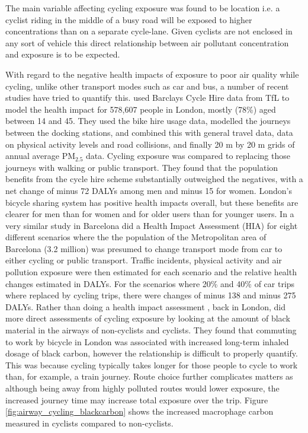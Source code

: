 The main variable affecting cycling exposure was found to be location i.e. a cyclist riding in the middle of a busy road will be exposed to higher concentrations than on a separate cycle-lane. Given cyclists are not enclosed in any sort of vehicle this direct relationship between air pollutant concentration and exposure is to be expected.

With regard to the negative health impacts of exposure to poor air quality while cycling, unlike other transport modes such as car and bus, a number of recent studies have tried to quantify this. \cite{Woodcock2014} used Barclays Cycle Hire data from TfL to model the health impact for 578,607 people in London, mostly (78\%) aged between 14 and 45. They used the bike hire usage data, modelled the journeys between the docking stations, and combined this with general travel data, data on physical activity levels and road collisions, and finally 20 m by 20 m grids of annual average PM$_{2.5}$ data. Cycling exposure was compared to replacing those journeys with walking or public transport. They found that the population benefits from the cycle hire scheme substantially outweighed the negatives, with a net change of minus 72 DALYs among men and minus 15 for women. London’s bicycle sharing system has positive health impacts overall, but these benefits are clearer for men than for women and for older users than for younger users. In a very similar study in Barcelona \cite{Rojas-Rueda2013} did a Health Impact Assessment (HIA) for eight different scenarios where the the population of the Metropolitan area of Barcelona (3.2 million) was presumed to change transport mode from car to either cycling or public transport. Traffic incidents, physical activity and air pollution exposure were then estimated for each scenario and the relative health changes estimated in DALYs. For the scenarios where 20\% and 40\% of car trips where replaced by cycling trips, there were changes of minus 138 and minus 275 DALYs. Rather than doing a health impact assessment \cite{Nwokoro2012}, back in London, did more direct assessments of cycling exposure by looking at the amount of black material in the airways of non-cyclists and cyclists. They found that commuting to work by bicycle in London was associated with increased long-term inhaled dosage of black carbon, however the relationship is difficult to properly quantify. This was because cycling typically takes longer for those people to cycle to work than, for example, a train journey. Route choice further complicates matters as although being away from highly polluted routes would lower exposure, the increased journey time may increase total exposure over the trip. Figure \ref{fig:airway_cycling_blackcarbon} shows the increased macrophage carbon measured in cyclists compared to non-cyclists.

